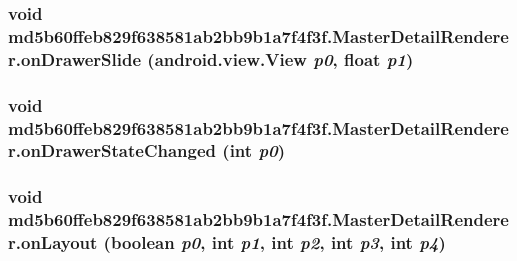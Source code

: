 \hypertarget{classmd5b60ffeb829f638581ab2bb9b1a7f4f3f_1_1_master_detail_renderer_90e6dc6e5a16837cc5e5a625bfd14ba1}{
\subsubsection[{onDrawerSlide}]{\setlength{\rightskip}{0pt plus 5cm}void md5b60ffeb829f638581ab2bb9b1a7f4f3f.MasterDetailRenderer.onDrawerSlide (android.view.View {\em p0}, \/  float {\em p1})}}
\label{classmd5b60ffeb829f638581ab2bb9b1a7f4f3f_1_1_master_detail_renderer_90e6dc6e5a16837cc5e5a625bfd14ba1}


\hypertarget{classmd5b60ffeb829f638581ab2bb9b1a7f4f3f_1_1_master_detail_renderer_076e7cfc3b531dbbb5ee5136cc89b3c2}{
\subsubsection[{onDrawerStateChanged}]{\setlength{\rightskip}{0pt plus 5cm}void md5b60ffeb829f638581ab2bb9b1a7f4f3f.MasterDetailRenderer.onDrawerStateChanged (int {\em p0})}}
\label{classmd5b60ffeb829f638581ab2bb9b1a7f4f3f_1_1_master_detail_renderer_076e7cfc3b531dbbb5ee5136cc89b3c2}


\hypertarget{classmd5b60ffeb829f638581ab2bb9b1a7f4f3f_1_1_master_detail_renderer_2a0acae4af9b3446d79e18c5f8817773}{
\subsubsection[{onLayout}]{\setlength{\rightskip}{0pt plus 5cm}void md5b60ffeb829f638581ab2bb9b1a7f4f3f.MasterDetailRenderer.onLayout (boolean {\em p0}, \/  int {\em p1}, \/  int {\em p2}, \/  int {\em p3}, \/  int {\em p4})}}
\label{classmd5b60ffeb829f638581ab2bb9b1a7f4f3f_1_1_master_detail_renderer_2a0acae4af9b3446d79e18c5f8817773}




